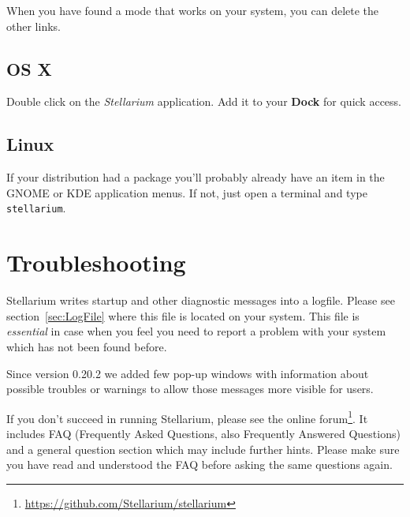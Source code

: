 When you have found a mode that works on your system, you can delete
the other links.

\subsection{OS X}
\label{sec:GettingStarted:Running:MacOSX}

Double click on the \emph{Stellarium} application.  Add it to your
\textbf{Dock} for quick access.

\subsection{Linux}
\label{sec:GettingStarted:Running:Linux}

If your distribution had a package you'll probably already have an
item in the GNOME or KDE application menus. If not, just open a
terminal and type \texttt{stellarium}.


\section{Troubleshooting}
\label{sec:GettingStarted:Running:Troubleshooting}

Stellarium writes startup and other diagnostic messages into a
logfile. Please see section~\ref{sec:LogFile} where this
file is located on your system. This file is \emph{essential} in case when
you feel you need to report a problem with your system which has not
been found before.

Since version 0.20.2 we added few pop-up windows with information about possible troubles or warnings to allow those messages more visible for users.

If you don't succeed in running Stellarium, please see the online
forum\footnote{\url{https://github.com/Stellarium/stellarium}}.  It includes
FAQ (Frequently Asked Questions, also Frequently Answered
Questions) and a general question section which may include
further hints. Please make sure you have read and understood the FAQ
before asking the same questions again.


